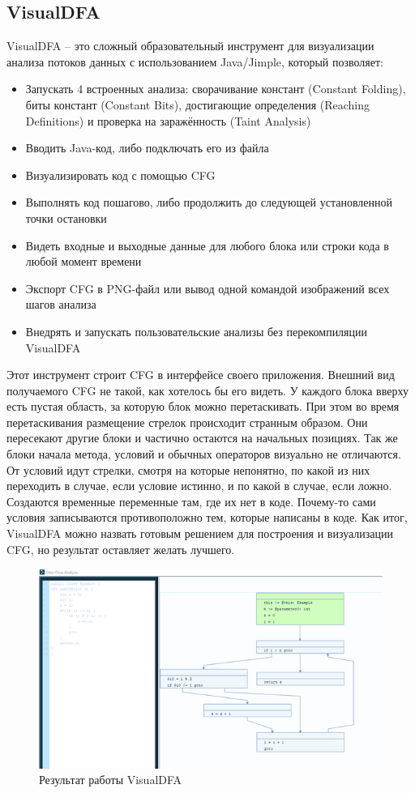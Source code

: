 \subsection{VisualDFA} \label{ch2:subsec-title-abbr}
VisualDFA – это сложный образовательный инструмент для визуализации анализа потоков данных с использованием Java/Jimple, который позволяет:
\begin{itemize}
\item Запускать 4 встроенных анализа: сворачивание констант (Constant Folding), биты констант (Constant Bits), достигающие определения (Reaching Definitions) и проверка на заражённость (Taint Analysis)
\item Вводить Java-код, либо подключать его из файла
\item Визуализировать код с помощью CFG
\item Выполнять код пошагово, либо продолжить до следующей установленной точки остановки
\item Видеть входные и выходные данные для любого блока или строки кода в любой момент времени
\item Экспорт CFG в PNG-файл или вывод одной командой изображений всех шагов анализа
\item Внедрять и запускать пользовательские анализы без перекомпиляции VisualDFA
\end{itemize}
Этот инструмент строит CFG в интерфейсе своего приложения. Внешний вид получаемого CFG не такой, как хотелось бы его видеть. У каждого блока вверху есть пустая область, за которую блок можно перетаскивать. При этом во время перетаскивания размещение стрелок происходит странным образом. Они пересекают другие блоки и частично остаются на начальных позициях. Так же блоки начала метода, условий и обычных операторов визуально не отличаются. От условий идут стрелки, смотря на которые непонятно, по какой из них переходить в случае, если условие истинно, и по какой в случае, если ложно. Создаются временные переменные там, где их нет в коде. Почему-то сами условия записываются противоположно тем, которые написаны в коде.
Как итог, VisualDFA можно назвать готовым решением для построения и визуализации CFG, но результат оставляет желать лучшего.
\begin{figure}[ht!] 
	\center
	\includegraphics [scale=0.27] {my_folder/images/my/10}
	\caption{Результат работы VisualDFA} 
	\label{fig:10}  
\end{figure}
